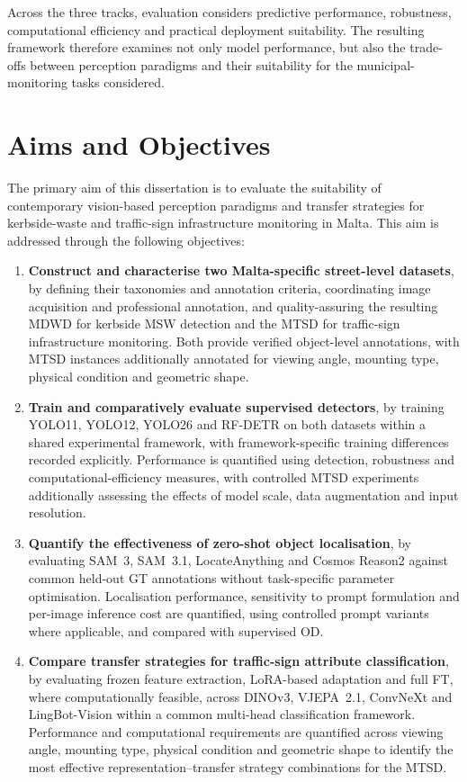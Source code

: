 Across the three tracks, evaluation considers predictive performance, robustness, computational efficiency and practical deployment suitability. The resulting framework therefore examines not only model performance, but also the trade-offs between perception paradigms and their suitability for the municipal-monitoring tasks considered.

\section{Aims and Objectives}
\label{sec:aims-objectives}
The primary aim of this dissertation is to evaluate the suitability of contemporary vision-based perception paradigms and transfer strategies for kerbside-waste and traffic-sign infrastructure monitoring in Malta. This aim is addressed through the following objectives:

\begin{enumerate}
    \item \textbf{Construct and characterise two Malta-specific street-level datasets}, by defining their taxonomies and annotation criteria, coordinating image acquisition and professional annotation, and quality-assuring the resulting \gls{MDWD} for kerbside \gls{MSW} detection and the \gls{MTSD} for traffic-sign infrastructure monitoring. Both provide verified object-level annotations, with \gls{MTSD} instances additionally annotated for viewing angle, mounting type, physical condition and geometric shape.
    
    \item \textbf{Train and comparatively evaluate supervised detectors}, by training \gls{YOLO}11, \gls{YOLO}12, \gls{YOLO}26 and \gls{RF-DETR} on both datasets within a shared experimental framework, with framework-specific training differences recorded explicitly. Performance is quantified using detection, robustness and computational-efficiency measures, with controlled \gls{MTSD} experiments additionally assessing the effects of model scale, data augmentation and input resolution.

    \item \textbf{Quantify the effectiveness of zero-shot object localisation}, by evaluating \gls{SAM}~3, \gls{SAM}~3.1, LocateAnything and Cosmos Reason2 against common held-out \gls{GT} annotations without task-specific parameter optimisation. Localisation performance, sensitivity to prompt formulation and per-image inference cost are quantified, using controlled prompt variants where applicable, and compared with supervised \gls{OD}.
     
    \item \textbf{Compare transfer strategies for traffic-sign attribute classification}, by evaluating frozen feature extraction, \gls{LoRA}-based adaptation and full \gls{FT}, where computationally feasible, across \gls{DINO}v3, \gls{VJEPA}~2.1, ConvNeXt and LingBot-Vision within a common multi-head classification framework. Performance and computational requirements are quantified across viewing angle, mounting type, physical condition and geometric shape to identify the most effective representation--transfer strategy combinations for the \gls{MTSD}.
\end{enumerate}

